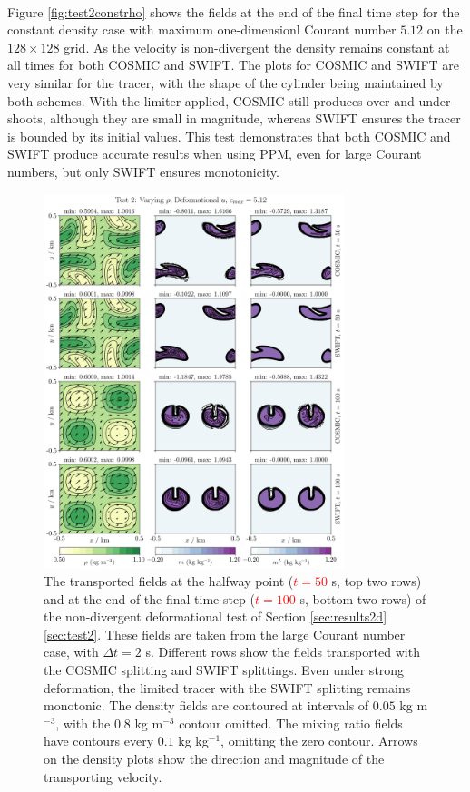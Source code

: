 \documentclass{ametsocV6.1}
\newcommand{\change}[1]{\textcolor{red}{#1}}
\begin{document}
\\
Figure \ref{fig:test2constrho} shows the fields at the end of the final time step for the constant density case with maximum one-dimensionl Courant number $5.12$ on the $128\times128$ grid. As the velocity is non-divergent the density remains constant at all times for both COSMIC and SWIFT. The plots for COSMIC and SWIFT are very similar for the tracer, with the shape of the cylinder being maintained by both schemes. With the limiter applied, COSMIC still produces over-and under-shoots, although they are small in magnitude, whereas SWIFT ensures the tracer is bounded by its initial values. This test demonstrates that both COSMIC and SWIFT produce accurate results when using PPM, even for large Courant numbers, but only SWIFT ensures monotonicity. \\
\begin{figure}[ht!]
\centering
\includegraphics[width=0.78\textwidth]{fig_4_deformational.jpg}
\caption{The transported fields at the halfway point (\change{$t=50$} s, top two rows) and at the end of the final time step (\change{$t=100$} s, bottom two rows) of the non-divergent deformational test of Section \ref{sec:results2d}\ref{sec:test2}. These fields are taken from the large Courant number case, with $\Delta t=2$ s. Different rows show the fields transported with the COSMIC splitting and SWIFT splittings.
Even under strong deformation, the limited tracer with the SWIFT splitting remains monotonic.
The density fields are contoured at intervals of $0.05$ kg m$^{-3}$, with the $0.8$ kg m$^{-3}$ contour omitted.
The mixing ratio fields have contours every $0.1$ kg kg$^{-1}$, omitting the zero contour.
Arrows on the density plots show the direction and magnitude of the transporting velocity.}\label{fig:test2}
\end{figure} 
\end{document}
